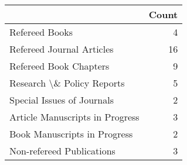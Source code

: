 \begin{tabular}{lr}
\toprule
 & Count \\
\midrule
Refereed Books & 4 \\
Refereed Journal Articles & 16 \\
Refereed Book Chapters & 9 \\
Research \textbackslash \& Policy Reports & 5 \\
Special Issues of Journals & 2 \\
Article Manuscripts in Progress & 3 \\
Book Manuscripts in Progress & 2 \\
Non-refereed Publications & 3 \\
\bottomrule
\end{tabular}
